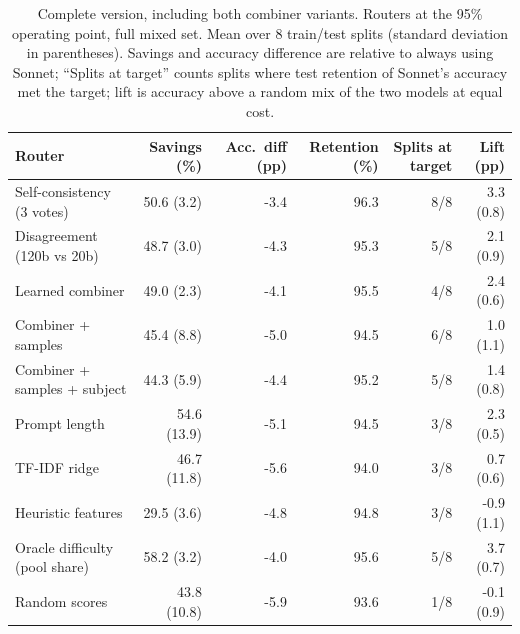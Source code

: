 \begin{table}[!htbp]
\centering\small
\caption{Complete version, including both combiner variants. Routers at the 95\% operating point, full mixed set. Mean over 8 train/test splits (standard deviation in parentheses). Savings and accuracy difference are relative to always using Sonnet; ``Splits at target'' counts splits where test retention of Sonnet's accuracy met the target; lift is accuracy above a random mix of the two models at equal cost.}\label{tab:95_full_all}
\begin{tabular}{lrrrrr}
\toprule
Router & Savings (\%) & Acc.\ diff (pp) & Retention (\%) & Splits at target & Lift (pp) \\
\midrule
Self-consistency (3 votes) & 50.6 (3.2) & -3.4 & 96.3 & 8/8 & 3.3 (0.8) \\
Disagreement (120b vs 20b) & 48.7 (3.0) & -4.3 & 95.3 & 5/8 & 2.1 (0.9) \\
Learned combiner & 49.0 (2.3) & -4.1 & 95.5 & 4/8 & 2.4 (0.6) \\
Combiner + samples & 45.4 (8.8) & -5.0 & 94.5 & 6/8 & 1.0 (1.1) \\
Combiner + samples + subject & 44.3 (5.9) & -4.4 & 95.2 & 5/8 & 1.4 (0.8) \\
Prompt length & 54.6 (13.9) & -5.1 & 94.5 & 3/8 & 2.3 (0.5) \\
TF-IDF ridge & 46.7 (11.8) & -5.6 & 94.0 & 3/8 & 0.7 (0.6) \\
Heuristic features & 29.5 (3.6) & -4.8 & 94.8 & 3/8 & -0.9 (1.1) \\
Oracle difficulty (pool share) & 58.2 (3.2) & -4.0 & 95.6 & 5/8 & 3.7 (0.7) \\
Random scores & 43.8 (10.8) & -5.9 & 93.6 & 1/8 & -0.1 (0.9) \\
\bottomrule
\end{tabular}
\end{table}
